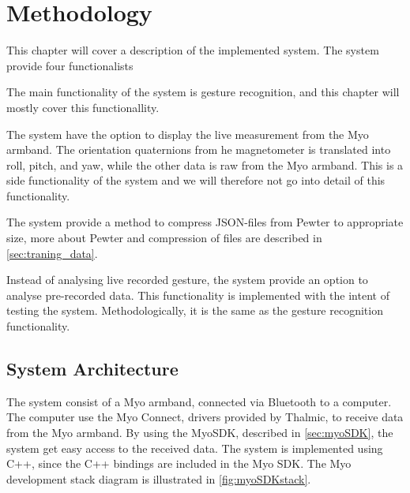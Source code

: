 \chapter{Methodology}
This chapter will cover a description of the implemented system. The system provide four functionalists 

\begin{description}[style=nextline]
    \item [Gesture recognition] The main functionality of the system is gesture recognition, and this chapter will mostly cover this functionallity.
    \item [Measurements display] The system have the option to display the live measurement from the Myo armband. The orientation quaternions from he magnetometer is translated into roll, pitch, and yaw, while the other data is raw from the Myo armband. This is a side functionality of the system and we will therefore not go into detail of this functionality.
    \item [Compress files] The system provide a method to compress JSON-files from Pewter to appropriate size, more about Pewter and compression of files are described in \cref{sec:traning_data}.
    \item [Pre-data gesture comparison] Instead of analysing live recorded gesture, the system provide an option to analyse pre-recorded data. This functionality is implemented with the intent of testing the system. Methodologically, it is the same as the gesture recognition functionality.
\end{description}

\section{System Architecture}
The system consist of a Myo armband, connected via Bluetooth to a computer. The computer use the Myo Connect, drivers provided by Thalmic, to receive data from the Myo armband. By using the MyoSDK, described in \cref{sec:myoSDK}, the system get easy access to the received data. The system is implemented using C++, since the C++ bindings are included in the Myo SDK. The Myo development stack diagram is illustrated in \cref{fig:myoSDKstack}.

